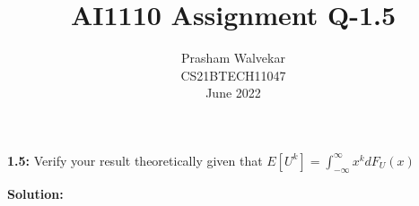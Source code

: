 \documentclass[journal,12pt,two column]{IEEEtran}
\title{AI1110 Assignment Q-1.5 }
\author{Prasham Walvekar \\ CS21BTECH11047 \\\vspace*{20pt} June 2022}
\newcommand*{\permcomb}[4][0mu]{{{}^{#3}\mkern#1#2_{#4}}}
\begin{document}
\maketitle

\newcommand{\solution}{\noindent \textbf{Solution: }}
\providecommand{\pr}[1]{\ensuremath{\Pr\left(#1\right)}}
\providecommand{\cdf}[2]{\ensuremath{\text{F}_{#1}\left(#2\right)}}
\providecommand{\qfunc}[1]{\ensuremath{Q\left(#1\right)}}
\providecommand{\sbrak}[1]{\ensuremath{{}\left[#1\right]}}
\providecommand{\lsbrak}[1]{\ensuremath{{}\left[#1\right.}}
\providecommand{\rsbrak}[1]{\ensuremath{{}\left.#1\right]}}
\providecommand{\brak}[1]{\ensuremath{\left(#1\right)}}
\providecommand{\lbrak}[1]{\ensuremath{\left(#1\right.}}
\providecommand{\rbrak}[1]{\ensuremath{\left.#1\right)}}
\providecommand{\cbrak}[1]{\ensuremath{\left\{#1\right\}}}
\providecommand{\lcbrak}[1]{\ensuremath{\left\{#1\right.}}
\newcommand*{\comb}[1][-1mu]{\permcomb[#1]{C}}
\renewcommand{\thetable}{\arabic{table}}
\providecommand{\rcbrak}[1]{\ensuremath{\left.#1\right\}}}
\newcommand{\myvec}[1]{\ensuremath{\begin{pmatrix}#1\end{pmatrix}}}
\newcommand{\mydet}[1]{\ensuremath{\begin{vmatrix}#1\end{vmatrix}}}
\let\vec\mathbf

\textbf{1.5:} Verify your result theoretically given that $E[U^{k}] = \int_{-\infty}^{\infty} x^{k}dF_U(x)$

\solution
\end{document}
